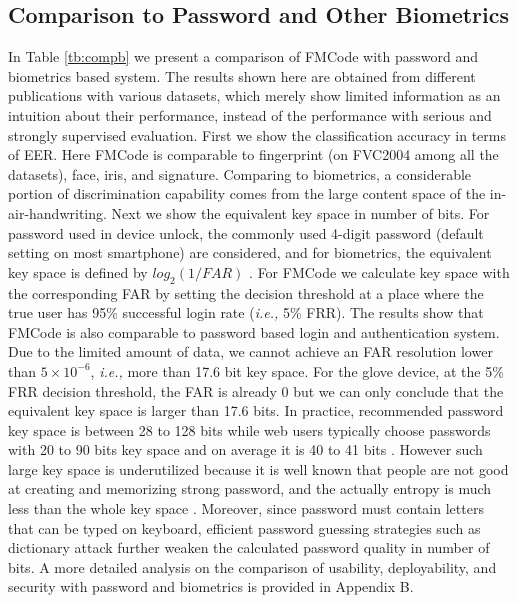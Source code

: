 \documentclass[conference]{IEEEtran}
\begin{document}
\subsection{Comparison to Password and Other Biometrics}

In Table \ref{tb:compb} we present a comparison of FMCode with password and biometrics based system. The results shown here are obtained from different publications with various datasets, which merely show limited information as an intuition about their performance, instead of the performance with serious and strongly supervised evaluation. First we show the classification accuracy in terms of EER. Here FMCode is comparable to fingerprint (on FVC2004 \cite{Fingerprint} among all the datasets), face, iris, and signature. Comparing to biometrics, a considerable portion of discrimination capability comes from the large content space of the in-air-handwriting. Next we show the equivalent key space in number of bits. For password used in device unlock, the commonly used 4-digit password (default setting on most smartphone) are considered, and for biometrics, the equivalent key space is defined by $log_2(1/FAR)$ \cite{Compare}. For FMCode we calculate key space with the corresponding FAR by setting the decision threshold at a place where the true user has 95\% successful login rate (\textit{i.e.,} 5\% FRR). The results show that FMCode is also comparable to password based login and authentication system. Due to the limited amount of data, we cannot achieve an FAR resolution lower than $5 \times 10^{-6}$, \textit{i.e.,} more than 17.6 bit key space. For the glove device, at the 5\% FRR decision threshold, the FAR is already 0 but we can only conclude that the equivalent key space is larger than 17.6 bits. In practice, recommended password key space is between 28 to 128 bits \cite{RFC4086} while web users typically choose passwords with 20 to 90 bits key space and on average it is 40 to 41 bits \cite{PasswordHabit}. However such large key space is underutilized because it is well known that people are not good at creating and memorizing strong password, and the actually entropy is much less than the whole key space \cite{PasswordEntropy}. Moreover, since password must contain letters that can be typed on keyboard, efficient password guessing strategies such as dictionary attack further weaken the calculated password quality in number of bits. A more detailed analysis on the comparison of usability, deployability, and security with password and biometrics is provided in Appendix B.
\end{document}
